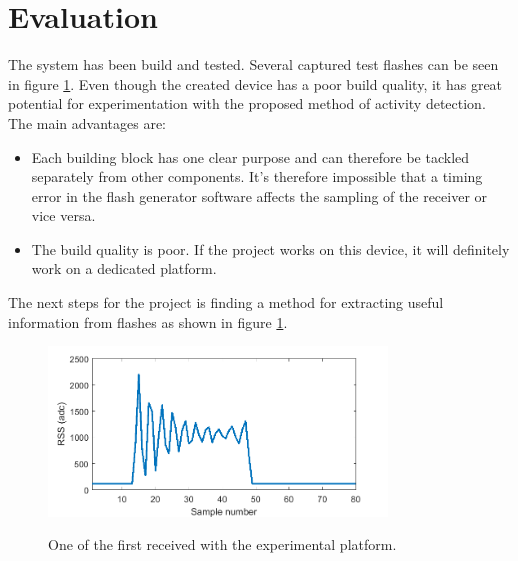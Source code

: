 \section{Evaluation}
The system has been build and tested. Several captured test flashes can be seen in figure \ref{fig:FristFlashes}. Even though the created device has a poor build quality, it has great potential for experimentation with the proposed method of activity detection. The main advantages are:
\begin{itemize}[itemsep=-1ex]
	\item Each building block has one clear purpose and can therefore be tackled separately from other components. It's therefore impossible that a timing error in the flash generator software affects the sampling of the receiver or vice versa.
	\item The build quality is poor. If the project works on this device, it will definitely work on a dedicated platform.
\end{itemize}
The next steps for the project is finding a method for extracting useful information from flashes as shown in figure \ref{fig:FristFlashes}. 

\begin{figure}
	\centering     %
	\label{fig:FristFlashes}
    \includegraphics[width=90mm]{pics/no_filter.png}
	\caption{One of the first received  with the experimental platform.}
\end{figure}